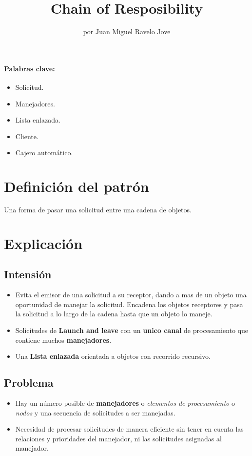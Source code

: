 \documentclass[a4paper,10pt]{article}
\title{Chain of Resposibility}
\author{por Juan Miguel Ravelo Jove}
\begin{document}
\maketitle

\paragraph{Palabras clave:} 
\begin{itemize}
 \item Solicitud.
 \item Manejadores.
 \item Lista enlazada.
 \item Cliente.
 \item Cajero autom\'atico.
\end{itemize}

\section{Definici\'on del patr\'on}
Una forma de pasar una solicitud entre una cadena de objetos.

\section{Explicaci\'on}
\subsection{Intensi\'on}
\begin{itemize}
 \item Evita el emisor de una solicitud a su receptor, dando a mas de un objeto una oportunidad de manejar la solicitud. Encadena los objetos receptores y pasa la solicitud a lo largo de la cadena hasta que un objeto lo maneje.
 \item Solicitudes de \textbf{Launch and leave} con un \textbf{unico canal} de procesamiento que contiene muchos \textbf{manejadores}.
 \item Una \textbf{Lista enlazada} orientada a objetos con recorrido recursivo.
\end{itemize}

\subsection{Problema}
\begin{itemize}
 \item Hay un n\'umero posible de \textbf{manejadores} o \emph{elementos de procesamiento} o \emph{nodos} y una secuencia de solicitudes a ser manejadas.
 \item Necesidad de procesar solicitudes de manera eficiente sin tener en cuenta las relaciones y prioridades del manejador, ni las solicitudes asignadas al manejador.
\end{itemize}
\end{document}
